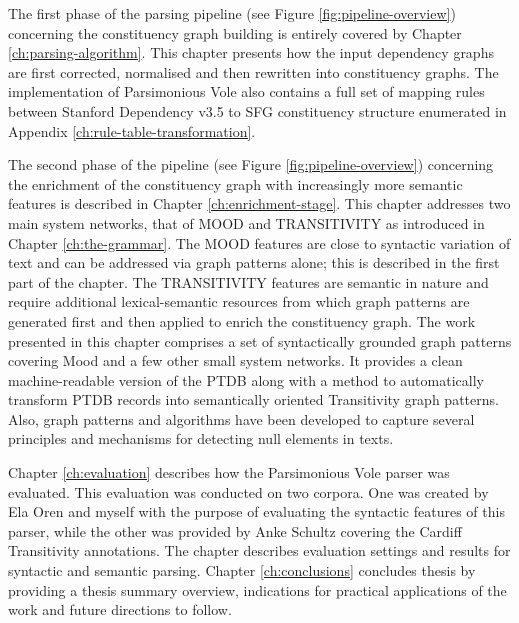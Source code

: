 The first phase of the parsing pipeline (see Figure \ref{fig:pipeline-overview}) concerning the constituency graph building is entirely covered by Chapter \ref{ch:parsing-algorithm}. This chapter presents how the input dependency graphs are first corrected, normalised and then rewritten into constituency graphs. The implementation of Parsimonious Vole also contains a full set of mapping rules between Stanford Dependency v3.5 to SFG constituency structure enumerated in Appendix \ref{ch:rule-table-transformation}.


The second phase of the pipeline (see Figure \ref{fig:pipeline-overview}) concerning the enrichment of the constituency graph with increasingly more semantic features is described in Chapter \ref{ch:enrichment-stage}. This chapter addresses two main system networks, that of MOOD and TRANSITIVITY as introduced in Chapter \ref{ch:the-grammar}. The MOOD features are close to syntactic variation of text and can be addressed via graph patterns alone; this is described in the first part of the chapter. The TRANSITIVITY features are semantic in nature and require additional lexical-semantic resources from which graph patterns are generated first and then applied to enrich the constituency graph. The work presented in this chapter comprises a set of syntactically grounded graph patterns covering Mood and a few other small system networks. It provides a clean machine-readable version of the PTDB along with a method to automatically transform PTDB records into semantically oriented Transitivity graph patterns. Also, graph patterns and algorithms have been developed to capture several principles and mechanisms for detecting null elements in texts.

Chapter \ref{ch:evaluation} describes how the Parsimonious Vole parser was evaluated. This evaluation was conducted on two corpora. One was created by Ela Oren and myself with the purpose of evaluating the syntactic features of this parser, while the other was provided by Anke Schultz covering the Cardiff Transitivity annotations. The chapter describes evaluation settings and results for syntactic and semantic parsing. Chapter \ref{ch:conclusions} concludes thesis by providing a thesis summary overview, indications for practical applications of the work and future directions to follow. 